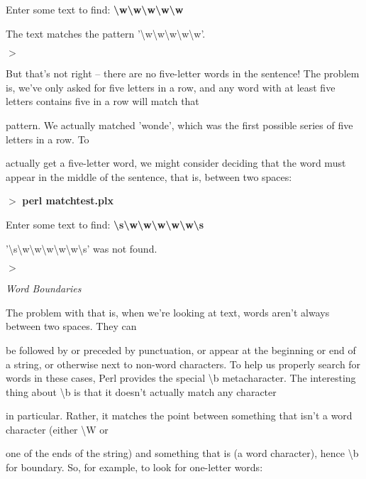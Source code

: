 \documentclass[a4paper,11pt]{book}
\begin{document}
\noindent Enter some text to find: \textbf{\textbackslash w\textbackslash w\textbackslash w\textbackslash w\textbackslash w}

\noindent The text matches the pattern '\textbackslash w\textbackslash w\textbackslash w\textbackslash w\textbackslash w'.

\noindent $>$

\noindent 

\noindent But that's not right -- there are no five-letter words in the sentence! The problem is, we've only asked for five letters in a row, and any word with at  least five letters contains five in a row will match that

\noindent pattern. We actually matched 'wonde', which was the first possible series of five letters in a row. To

\noindent actually get a five-letter word, we might consider deciding that the word must appear in the middle of the sentence, that is, between two spaces:

\noindent 

\noindent $>$ \textbf{perl matchtest.plx}

\noindent Enter some text to find: \textbf{\textbackslash s\textbackslash w\textbackslash w\textbackslash w\textbackslash w\textbackslash w\textbackslash s}

\noindent '\textbackslash s\textbackslash w\textbackslash w\textbackslash w\textbackslash w\textbackslash w\textbackslash s' was not found.

\noindent $>$

\noindent 

\noindent \textit{Word Boundaries}

\noindent The problem with that is, when we're looking at text, words aren't always between two spaces. They can

\noindent be followed by or preceded by punctuation, or appear at the beginning or end of a string, or otherwise next to non-word characters. To help us properly search for words in these cases, Perl provides the special \textbackslash b metacharacter. The interesting thing about \textbackslash b is that it doesn't actually match any character

\noindent in particular. Rather, it matches the point between something that isn't a word character (either \textbackslash W or

\noindent one of the ends of the string) and something that is (a word character), hence \textbackslash b for boundary. So, for example, to look for one-letter words:
\end{document}
